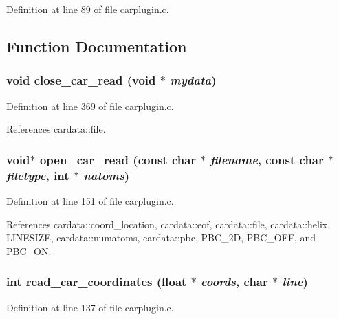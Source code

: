 Definition at line 89 of file carplugin.c.

\subsection{Function Documentation}
\subsubsection{\setlength{\rightskip}{0pt plus 5cm}void close\_\-car\_\-read (void $\ast$ {\em mydata})\hspace{0.3cm}{\tt  [static]}}\label{carplugin_8c_a10}




Definition at line 369 of file carplugin.c.

References cardata::file.
\subsubsection{\setlength{\rightskip}{0pt plus 5cm}void$\ast$ open\_\-car\_\-read (const char $\ast$ {\em filename}, const char $\ast$ {\em filetype}, int $\ast$ {\em natoms})\hspace{0.3cm}{\tt  [static]}}\label{carplugin_8c_a7}




Definition at line 151 of file carplugin.c.

References cardata::coord\_\-location, cardata::eof, cardata::file, cardata::helix, LINESIZE, cardata::numatoms, cardata::pbc, PBC\_\-2D, PBC\_\-OFF, and PBC\_\-ON.
\subsubsection{\setlength{\rightskip}{0pt plus 5cm}int read\_\-car\_\-coordinates (float $\ast$ {\em coords}, char $\ast$ {\em line})\hspace{0.3cm}{\tt  [static]}}\label{carplugin_8c_a6}




Definition at line 137 of file carplugin.c.

